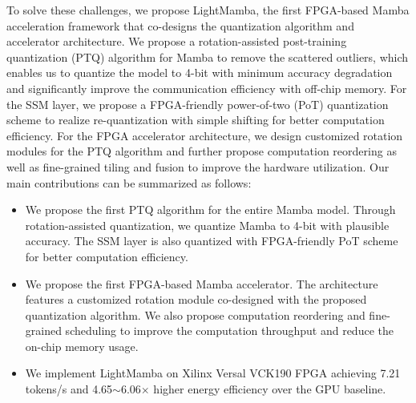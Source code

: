 To solve these challenges, we propose LightMamba, the first FPGA-based Mamba acceleration framework that co-designs
the quantization algorithm and accelerator architecture. 
We propose a rotation-assisted post-training quantization (PTQ)
algorithm for Mamba to remove the scattered outliers, which enables us to quantize the model to 4-bit with minimum 
accuracy degradation and significantly improve the communication efficiency with off-chip memory. 
For the SSM layer,
we propose a FPGA-friendly power-of-two (PoT) quantization scheme to realize re-quantization with simple shifting for better
computation efficiency. 
For the FPGA accelerator architecture, we design customized rotation modules for the PTQ algorithm
and further propose computation reordering as well as fine-grained tiling and fusion to improve the hardware utilization.
Our main contributions can be summarized as follows:
\begin{itemize}
    \item We propose the first PTQ algorithm for the entire Mamba model.
    Through rotation-assisted quantization, we quantize Mamba to 4-bit with plausible accuracy.
    The SSM layer is also quantized with FPGA-friendly PoT scheme for better computation efficiency.
    \item We propose the first FPGA-based Mamba accelerator. The architecture features a customized rotation module
    co-designed with the proposed quantization algorithm. We also propose computation reordering and
    fine-grained scheduling to improve the computation throughput and reduce the on-chip memory usage.
    \item We implement LightMamba on Xilinx Versal VCK190 FPGA achieving 7.21 tokens/s and 4.65$\sim$6.06$\times$ higher energy efficiency over the GPU baseline. 
\end{itemize}



